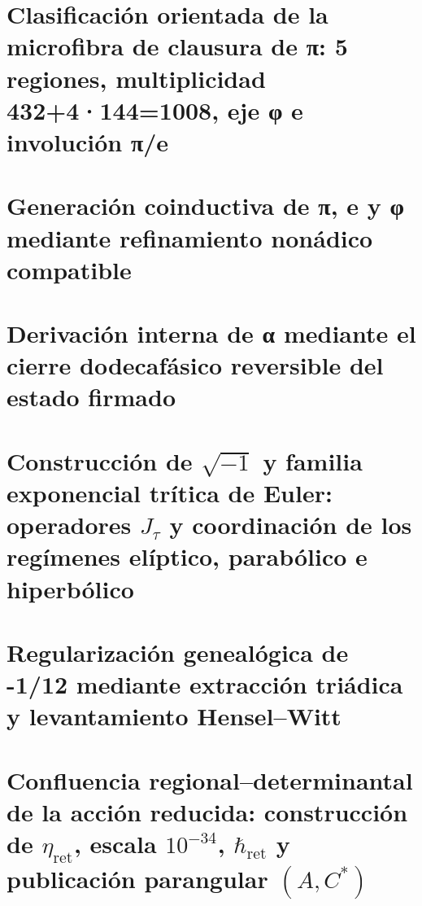 \chapter{Clasificación orientada de la microfibra de clausura de π: 5 regiones, multiplicidad 432+4·144=1008, eje φ e involución π/e}
\label{chap:sucesor-102-09}


\chapter{Generación coinductiva de π, e y φ mediante refinamiento nonádico compatible}
\label{chap:sucesor-102-10}



\chapter{Derivación interna de α mediante el cierre dodecafásico reversible del estado firmado}
\label{chap:sucesor-102-11}


\chapter{Construcción de \texorpdfstring{\(\sqrt{-1}\)}{√(−1)} y familia exponencial trítica de Euler: operadores \texorpdfstring{\(J_\tau\)}{J_τ} y coordinación de los regímenes elíptico, parabólico e hiperbólico}
\label{chap:sucesor-102-12}


\chapter{Regularización genealógica de -1/12 mediante extracción triádica y levantamiento Hensel–Witt}
\label{chap:sucesor-102-13}


\chapter{Confluencia regional–determinantal de la acción reducida: construcción de \texorpdfstring{\(\eta_{\mathrm{ret}}\)}{η_ret}, escala \texorpdfstring{\(10^{-34}\)}{10⁻³⁴}, \texorpdfstring{\(\hbar_{\mathrm{ret}}\)}{ℏ_ret} y publicación parangular \texorpdfstring{\((A,C^*)\)}{(A,C*)}}
\label{chap:sucesor-102-14}



